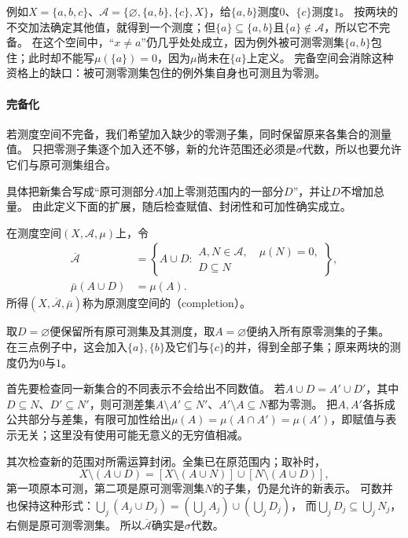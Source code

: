 例如$X=\{a,b,c\}$、$\mathcal A=\{\varnothing,\{a,b\},\{c\},X\}$，给$\{a,b\}$测度$0$、$\{c\}$测度$1$。
按两块的不交加法确定其他值，就得到一个测度；但$\{a\}\subseteq\{a,b\}$且$\{a\}\notin\mathcal A$，所以它不完备。
在这个空间中，“$x\neq a$”仍几乎处处成立，因为例外被可测零测集$\{a,b\}$包住；此时却不能写$\mu(\{a\})=0$，因为$\mu$尚未在$\{a\}$上定义。
完备空间会消除这种资格上的缺口：被可测零测集包住的例外集自身也可测且为零测。

\paragraph{完备化}

若测度空间不完备，我们希望加入缺少的零测子集，同时保留原来各集合的测量值。
只把零测子集逐个加入还不够，新的允许范围还必须是$\sigma$代数，所以也要允许它们与原可测集组合。

具体把新集合写成“原可测部分$A$加上零测范围内的一部分$D$”，并让$D$不增加总量。
由此定义下面的扩展，随后检查赋值、封闭性和可加性确实成立。
\begin{definition}[测度空间的完备化]
在测度空间$(X,\mathcal A,\mu)$上，令
\[
 \begin{aligned}
 \overline{\mathcal A}&=\left\{A\cup D:
 \begin{array}{l}A,N\in\mathcal A,\quad\mu(N)=0,\\D\subseteq N\end{array}\right\},\\
 \bar\mu(A\cup D)&=\mu(A).
 \end{aligned}
\]
所得$(X,\overline{\mathcal A},\bar\mu)$称为原测度空间的（completion）。
\end{definition}
取$D=\varnothing$便保留所有原可测集及其测度，取$A=\varnothing$便纳入所有原零测集的子集。
在三点例子中，这会加入$\{a\},\{b\}$及它们与$\{c\}$的并，得到全部子集；原来两块的测度仍为$0$与$1$。

首先要检查同一新集合的不同表示不会给出不同数值。
若$A\cup D=A'\cup D'$，其中$D\subseteq N$、$D'\subseteq N'$，则可测差集$A\setminus A'\subseteq N'$、$A'\setminus A\subseteq N$都为零测。
把$A,A'$各拆成公共部分与差集，有限可加性给出$\mu(A)=\mu(A\cap A')=\mu(A')$，即赋值与表示无关；这里没有使用可能无意义的无穷值相减。

其次检查新的范围对所需运算封闭。全集已在原范围内；取补时，
\[
 X\setminus(A\cup D)=[X\setminus(A\cup N)]\cup[N\setminus(A\cup D)],
\]
第一项原本可测，第二项是原可测零测集$N$的子集，仍是允许的新表示。
可数并也保持这种形式：$\bigcup_j(A_j\cup D_j)=(\bigcup_jA_j)\cup(\bigcup_jD_j)$，
而$\bigcup_jD_j\subseteq\bigcup_jN_j$，右侧是原可测零测集。
所以$\overline{\mathcal A}$确实是$\sigma$代数。

